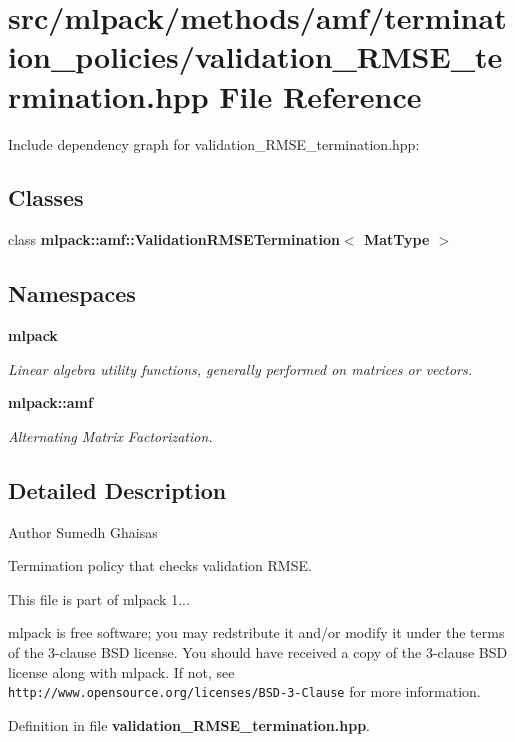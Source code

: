 \section{src/mlpack/methods/amf/termination\-\_\-policies/validation\-\_\-\-R\-M\-S\-E\-\_\-termination.hpp File Reference}
\label{validation__RMSE__termination_8hpp}
Include dependency graph for validation\-\_\-\-R\-M\-S\-E\-\_\-termination.\-hpp\-:
\subsection*{Classes}
\begin{DoxyCompactItemize}
\item 
class {\bf mlpack\-::amf\-::\-Validation\-R\-M\-S\-E\-Termination$<$ Mat\-Type $>$}
\end{DoxyCompactItemize}
\subsection*{Namespaces}
\begin{DoxyCompactItemize}
\item 
{\bf mlpack}
\begin{DoxyCompactList}\small\item\em Linear algebra utility functions, generally performed on matrices or vectors. \end{DoxyCompactList}\item 
{\bf mlpack\-::amf}
\begin{DoxyCompactList}\small\item\em Alternating Matrix Factorization. \end{DoxyCompactList}\end{DoxyCompactItemize}


\subsection{Detailed Description}
\begin{DoxyAuthor}{Author}
Sumedh Ghaisas
\end{DoxyAuthor}
Termination policy that checks validation R\-M\-S\-E.

This file is part of mlpack 1...

mlpack is free software; you may redstribute it and/or modify it under the terms of the 3-\/clause B\-S\-D license. You should have received a copy of the 3-\/clause B\-S\-D license along with mlpack. If not, see {\tt http\-://www.\-opensource.\-org/licenses/\-B\-S\-D-\/3-\/\-Clause} for more information. 

Definition in file {\bf validation\-\_\-\-R\-M\-S\-E\-\_\-termination.\-hpp}.

